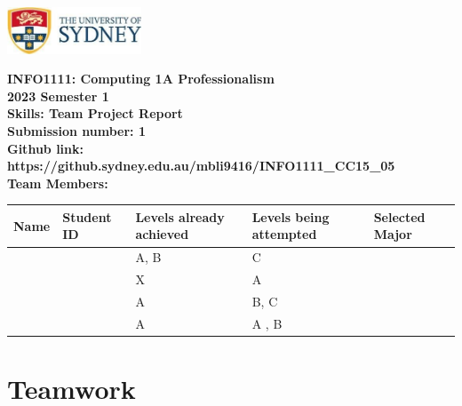 \documentclass[a4paper, 11pt]{report}
\begin{document}
\begin{titlepage}
\begin{flushright}
\includegraphics[width=4cm]{USyd}\\[2cm]
\end{flushright}
\center 
\textbf{\huge INFO1111: Computing 1A Professionalism}\\[0.75cm]
\textbf{\huge 2023 Semester 1}\\[2cm]
\textbf{\huge Skills: Team Project Report}\\[3cm]

\textbf{\huge Submission number: 1}\\[0.75cm]
\textbf{Github link: https://github.sydney.edu.au/mbli9416/INFO1111\_CC15\_05}\\[0.75cm]
\textbf{\huge Team Members:}\\[0.75cm]

\begin{tabular}{|p{}|p{}|p{}|p{}|p{}|}
	\hline
	Name & Student ID & \raggedright{Levels already achieved} & \raggedright{Levels being attempted} & Selected Major \\
	\hline
	\hline
	\raggedright{\studA} & \sidA & A, B & C & \majA \\
	\raggedright{\studB} & \sidB & X & A & \majB \\
	\raggedright{\studC} & \sidC & A & B,  C & \majC \\
	\raggedright{\studD} & \sidD & A & A , B & \majD \\
	\hline
\end{tabular}
\thispagestyle{empty}
\end{titlepage}



\tableofcontents



\newpage
\section{Teamwork}
\label{sect-team}
\end{document}
